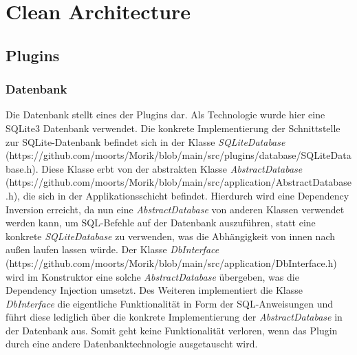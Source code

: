 \chapter{Clean Architecture}
\section{Plugins}
\subsection{Datenbank}
Die Datenbank stellt eines der Plugins dar. Als Technologie wurde hier eine SQLite3 Datenbank verwendet. Die konkrete Implementierung der Schnittstelle zur SQLite-Datenbank befindet sich in der Klasse \textit{SQLiteDatabase} (https://github.com/moorts/Morik/blob/main/src/plugins/database/SQLiteDatabase.h). Diese Klasse erbt von der abstrakten Klasse \textit{AbstractDatabase} (https://github.com/moorts/Morik/blob/main/src/application/AbstractDatabase.h), die sich in der Applikationsschicht befindet. Hierdurch wird eine Dependency Inversion erreicht, da nun eine \textit{AbstractDatabase} von anderen Klassen verwendet werden kann, um SQL-Befehle auf der Datenbank auszuführen, statt eine konkrete \textit{SQLiteDatabase} zu verwenden, was die Abhängigkeit von innen nach außen laufen lassen würde. Der Klasse \textit{DbInterface} (https://github.com/moorts/Morik/blob/main/src/application/DbInterface.h) wird im Konstruktor eine solche \textit{AbstractDatabase} übergeben, was die Dependency Injection umsetzt. Des Weiteren implementiert die Klasse \textit{DbInterface} die eigentliche Funktionalität in Form der SQL-Anweisungen und führt diese lediglich über die konkrete Implementierung der \textit{AbstractDatabase} in der Datenbank aus. Somit geht keine Funktionalität verloren, wenn das Plugin durch eine andere Datenbanktechnologie ausgetauscht wird.

